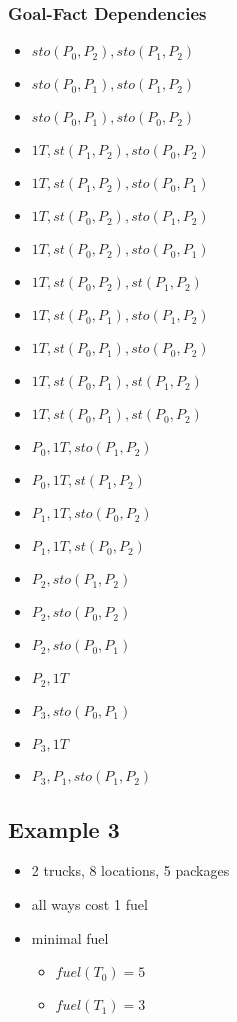 \FloatBarrier
\subsubsection*{Goal-Fact Dependencies}

\begin{itemize}
	\item $sto(P_0,P_2),sto(P_1,P_2)$
	\item $sto(P_0,P_1),sto(P_1,P_2)$
	\item $sto(P_0,P_1),sto(P_0,P_2)$
	\item $1T,st(P_1,P_2),sto(P_0,P_2)$
	\item $1T,st(P_1,P_2),sto(P_0,P_1)$
	\item $1T,st(P_0,P_2),sto(P_1,P_2)$
	\item $1T,st(P_0,P_2),sto(P_0,P_1)$
	\item $1T,st(P_0,P_2),st(P_1,P_2)$
	\item $1T,st(P_0,P_1),sto(P_1,P_2)$
	\item $1T,st(P_0,P_1),sto(P_0,P_2)$
	\item $1T,st(P_0,P_1),st(P_1,P_2)$
	\item $1T,st(P_0,P_1),st(P_0,P_2)$
	\item $P_0,1T,sto(P_1,P_2)$
	\item $P_0,1T,st(P_1,P_2)$
	\item $P_1,1T,sto(P_0,P_2)$
	\item $P_1,1T,st(P_0,P_2)$
	\item $P_2,sto(P_1,P_2)$
	\item $P_2,sto(P_0,P_2)$
	\item $P_2,sto(P_0,P_1)$
	\item $P_2,1T$
	\item $P_3,sto(P_0,P_1)$
	\item $P_3,1T$
	\item $P_3,P_1,sto(P_1,P_2)$
\end{itemize}

\newpage
\subsection*{Example 3}

	\begin{itemize}
		\item 2 trucks, 8 locations, 5 packages
		\item all ways cost 1 fuel
		\item minimal fuel
		\begin{itemize}
			\item $fuel(T_0) = 5$
			\item $fuel(T_1) = 3$
		\end{itemize}
	\end{itemize}

